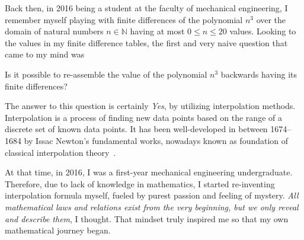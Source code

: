 Back then, in 2016 being a student at the faculty of mechanical engineering,
I remember myself playing with finite differences of the polynomial $n^3$ over the domain of natural numbers $n\in\mathbb{N}$
having at most $0 \leq n \leq 20$ values.
Looking to the values in my finite difference tables, the first and very naive question that came to my mind was
\begin{question}
    Is it possible to re-assemble the value of the polynomial $n^3$ backwards
    having its finite differences?
\end{question}
The answer to this question is certainly \textit{Yes}, by utilizing interpolation methods.
Interpolation is a process of finding new data points based on the range of a discrete set of known data points.
It has been well-developed in between 1674--1684
by Issac Newton's fundamental works, nowadays known as foundation of classical interpolation
theory~\cite{meijering2002chronology}.

At that time, in 2016, I was a first-year mechanical engineering undergraduate.
Therefore, due to lack of knowledge in mathematics, I started re-inventing interpolation
formula myself, fueled by purest passion and feeling of mystery.
\textit{All mathematical laws and relations exist from the very beginning, but we only reveal and describe them}, I thought.
That mindset truly inspired me so that my own mathematical journey began.

